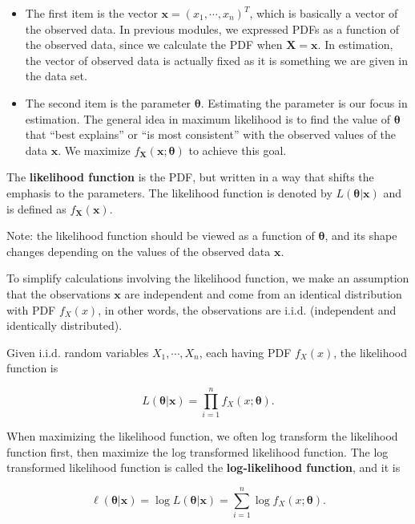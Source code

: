 \documentclass[
]{book}
\begin{document}
\begin{itemize}
\item
  The first item is the vector \(\boldsymbol{x} = (x_1, \cdots, x_n)^{T}\), which is basically a vector of the observed data. In previous modules, we expressed PDFs as a function of the observed data, since we calculate the PDF when \(\boldsymbol{X} = \boldsymbol{x}\). In estimation, the vector of observed data is actually fixed as it is something we are given in the data set.
\item
  The second item is the parameter \(\boldsymbol{\theta}\). Estimating the parameter is our focus in estimation. The general idea in maximum likelihood is to find the value of \(\boldsymbol{\theta}\) that ``best explains'' or ``is most consistent'' with the observed values of the data \(\boldsymbol{x}\). We maximize \(f_{\boldsymbol{X}}(\boldsymbol{x}; \boldsymbol{\theta})\) to achieve this goal.
\end{itemize}

The \textbf{likelihood function} is the PDF, but written in a way that shifts the emphasis to the parameters. The likelihood function is denoted by \(L(\boldsymbol{\theta} | \boldsymbol{x})\) and is defined as \(f_{\boldsymbol{X}}(\boldsymbol{x})\).

Note: the likelihood function should be viewed as a function of \(\boldsymbol{\theta}\), and its shape changes depending on the values of the observed data \(\boldsymbol{x}\).

To simplify calculations involving the likelihood function, we make an assumption that the observations \(\boldsymbol{x}\) are independent and come from an identical distribution with PDF \(f_X(x)\), in other words, the observations are i.i.d. (independent and identically distributed).

Given i.i.d. random variables \(X_1, \cdots, X_n\), each having PDF \(f_X(x)\), the likelihood function is

\begin{equation} 
L(\boldsymbol{\theta} | \boldsymbol{x} ) = \prod_{i=1}^n f_X(x; \boldsymbol{\theta}).
\label{eq:7-like}
\end{equation}

When maximizing the likelihood function, we often log transform the likelihood function first, then maximize the log transformed likelihood function. The log transformed likelihood function is called the \textbf{log-likelihood function}, and it is

\begin{equation} 
\ell(\boldsymbol{\theta} | \boldsymbol{x}) = \log L(\boldsymbol{\theta} | \boldsymbol{x}) = \sum_{i=1}^n \log f_X(x; \boldsymbol{\theta}).
\label{eq:7-loglike}
\end{equation}
\end{document}
